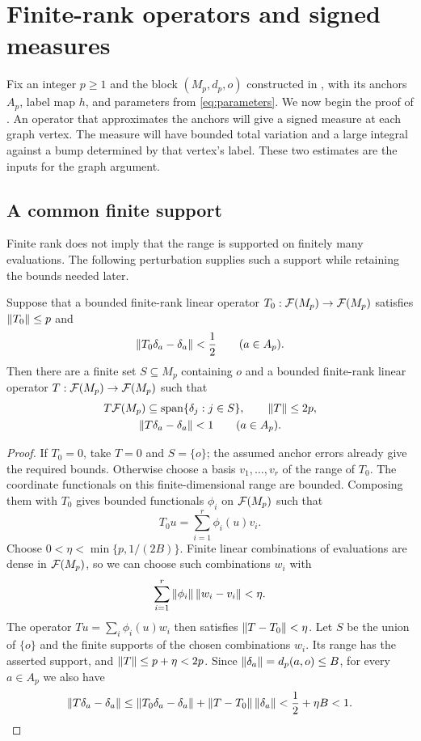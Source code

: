 \section{Finite-rank operators and signed measures}\label{sec:operators}

Fix an integer $p\ge1$ and the block $(M_p,d_p,o)$ constructed in
, with its anchors $A_p$, label map $h$, and
parameters from \eqref{eq:parameters}. We now begin the proof of
. An operator that approximates the anchors will give a
signed measure at each graph vertex. The measure will have bounded total
variation and a large integral against a bump determined by that vertex's
label. These two estimates are the inputs for the graph argument.

\subsection{A common finite support}

Finite rank does not imply that the range is supported on finitely many
evaluations. The following perturbation supplies such a support while
retaining the bounds needed later.

\begin{lemma}\label{lem:finite-support}
Suppose that a bounded finite-rank linear operator
$T_0:\mathcal F(M_p)\to\mathcal F(M_p)$ satisfies $\left\|T_0\right\|\le p$ and
\[
 \left\|T_0\delta_a-\delta_a\right\|<\frac12\qquad(a\in A_p).
\]
Then there are a finite set $S\subseteq M_p$ containing $o$ and a bounded
finite-rank linear operator $T:\mathcal F(M_p)\to\mathcal F(M_p)$ such that
\begin{equation}\label{eq:operator-bounds}
 \begin{gathered}
 T\mathcal F(M_p)\subseteq\operatorname{span}\{\delta_j:j\in S\},\qquad
 \left\|T\right\|\le2p,\\
 \left\|T\delta_a-\delta_a\right\|<1\qquad(a\in A_p).
 \end{gathered}
\end{equation}
\end{lemma}

\begin{proof}
If $T_0=0$, take $T=0$ and $S=\{o\}$; the assumed anchor errors already
give the required bounds. Otherwise choose a basis $v_1,\ldots,v_r$ of
the range of $T_0$. The coordinate functionals on this finite-dimensional
range are bounded. Composing them with $T_0$ gives bounded functionals
$\phi_i$ on $\mathcal F(M_p)$ such that
\[
 T_0u=\sum_{i=1}^r\phi_i(u)v_i.
\]
Choose $0<\eta<\min\{p,1/(2B)\}$. Finite linear combinations of
evaluations are dense in $\mathcal F(M_p)$, so we can choose such combinations
$w_i$ with
\[
 \sum_{i=1}^r\left\|\phi_i\right\|\left\|w_i-v_i\right\|<\eta.
\]
The operator $Tu=\sum_i\phi_i(u)w_i$ then satisfies
$\left\|T-T_0\right\|<\eta$. Let $S$ be the union of $\{o\}$ and the finite
supports of the chosen combinations $w_i$. Its range has the asserted
support, and $\left\|T\right\|\le p+\eta<2p$. Since
$\left\|\delta_a\right\|=d_p(a,o)\le B$, for every $a\in A_p$ we also have
\[
 \left\|T\delta_a-\delta_a\right\|
 \le\left\|T_0\delta_a-\delta_a\right\|+\left\|T-T_0\right\|\left\|\delta_a\right\|
 <\frac12+\eta B<1.\qedhere
\]
\end{proof}

